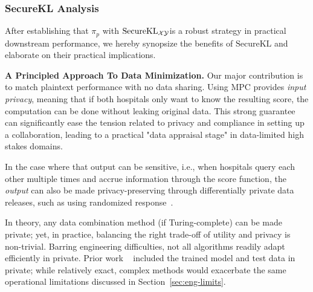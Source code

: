 \subsubsection{SecureKL Analysis}
\label{sec:skl_discuss}
After establishing that $\pi_p$ with $\mathrm{Secure}\mathrm{KL}_{\mathcal{X}\mathcal{Y}}$is a robust strategy in practical downstream performance, we hereby synopsize the benefits of $\mathrm{SecureKL}$ and elaborate on their practical implications.

\textbf{A Principled Approach To Data Minimization.}
Our major contribution is to match plaintext performance with no data sharing. Using MPC provides \emph{input privacy}, meaning that if both hospitals only want to know the resulting score, the computation can be done without leaking original data. This strong guarantee can significantly ease the tension related to privacy and compliance in setting up a collaboration, leading to a practical "data appraisal stage" in data-limited high stakes domains. 

In the case where that output can be sensitive, i.e., when hospitals query each other multiple times and accrue information through the score function, the \emph{output} can also be made privacy-preserving through differentially private data releases, such as using randomized response~\cite{dwork2014algorithmic}.

In theory, any data combination method (if Turing-complete) can be made private; yet, in practice, balancing the right trade-off of utility and privacy is non-trivial.
Barring engineering difficulties, not all algorithms readily adapt efficiently in private. Prior work ~\cite{xu2022data} included the trained model and test data in private; while relatively exact, complex methods would exacerbate the same operational limitations discussed in Section~\ref{sec:eng-limits}.

